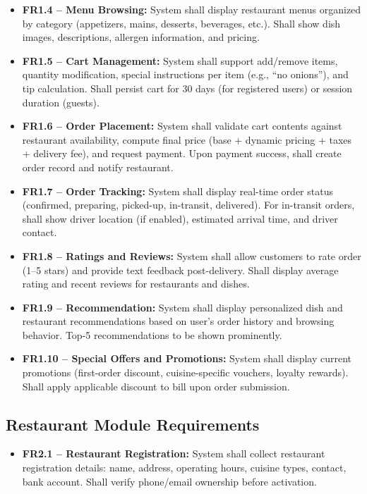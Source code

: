 \documentclass[12pt,a4paper]{report}
\begin{document}
\begin{itemize}
\begin{itemize}
    \item \textbf{FR1.4 -- Menu Browsing:} System shall display restaurant menus organized by category (appetizers, mains, desserts, beverages, etc.). Shall show dish images, descriptions, allergen information, and pricing.
    
    \item \textbf{FR1.5 -- Cart Management:} System shall support add/remove items, quantity modification, special instructions per item (e.g., ``no onions''), and tip calculation. Shall persist cart for 30 days (for registered users) or session duration (guests).
    
    \item \textbf{FR1.6 -- Order Placement:} System shall validate cart contents against restaurant availability, compute final price (base + dynamic pricing + taxes + delivery fee), and request payment. Upon payment success, shall create order record and notify restaurant.
    
    \item \textbf{FR1.7 -- Order Tracking:} System shall display real-time order status (confirmed, preparing, picked-up, in-transit, delivered). For in-transit orders, shall show driver location (if enabled), estimated arrival time, and driver contact.
    
    \item \textbf{FR1.8 -- Ratings and Reviews:} System shall allow customers to rate order (1--5 stars) and provide text feedback post-delivery. Shall display average rating and recent reviews for restaurants and dishes.
    
    \item \textbf{FR1.9 -- Recommendation:} System shall display personalized dish and restaurant recommendations based on user's order history and browsing behavior. Top-5 recommendations to be shown prominently.
    
    \item \textbf{FR1.10 -- Special Offers and Promotions:} System shall display current promotions (first-order discount, cuisine-specific vouchers, loyalty rewards). Shall apply applicable discount to bill upon order submission.
\end{itemize}

\subsection{Restaurant Module Requirements}

\begin{itemize}
    \item \textbf{FR2.1 -- Restaurant Registration:} System shall collect restaurant registration details: name, address, operating hours, cuisine types, contact, bank account. Shall verify phone/email ownership before activation.
    

\end{itemize}
\end{itemize}
\end{document}
